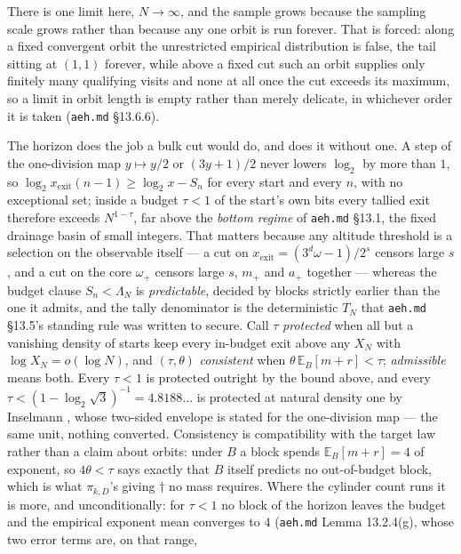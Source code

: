 \documentclass[11pt]{article}
\theoremstyle{remark}
\newcommand{\w}{\omega}
\newcommand{\wnext}{\w_{+}}
\begin{document}
There is one limit here, $N \to \infty$, and the sample grows because the sampling
scale grows rather than because any one orbit is run forever. That is forced: along
a fixed convergent orbit the unrestricted empirical distribution is false, the
tail sitting at $(1,1)$ forever, while above a fixed cut such an orbit
supplies only finitely many qualifying visits and none at all once the cut exceeds
its maximum, so a limit in orbit length is empty rather than merely delicate, in
whichever order it is taken (\texttt{aeh.md} \S13.6.6).

The horizon does the job a bulk cut would do, and does it without one. A step of
the one-division map $y \mapsto y/2$ or $(3y+1)/2$ never lowers $\log_2$ by more
than $1$, so $\log_2 x_{\mathrm{exit}}(n-1) \ge \log_2 x - S_n$ for every start and
every $n$, with no exceptional set; inside a budget $\tau < 1$ of the start's own
bits every tallied exit therefore exceeds $N^{1-\tau}$, far above the
\emph{bottom regime} of \texttt{aeh.md} \S13.1, the fixed drainage basin of small
integers. That matters because any altitude
threshold is a selection on the observable itself --- a cut on
$x_{\mathrm{exit}} = (3^{d}\w - 1)/2^{s}$ censors large $s$, and a cut on the core
$\wnext$ censors large $s$, $m_+$ and $a_+$ together --- whereas the budget clause
$S_n < \Lambda_N$ is \emph{predictable}, decided by blocks strictly earlier than
the one it admits, and the tally denominator is the deterministic $T_N$ that
\texttt{aeh.md} \S13.5's standing rule was written to secure. Call $\tau$
\emph{protected} when all but a
vanishing density of starts keep every in-budget exit above any $X_N$ with
$\log X_N = o(\log N)$, and $(\tau,\theta)$ \emph{consistent} when
$\theta\,\mathbb{E}_B[m+r] < \tau$; \emph{admissible} means both. Every
$\tau < 1$ is protected outright by the bound above, and every
$\tau < (1-\log_2\sqrt3)^{-1} = 4.8188\ldots$ is protected at natural density one
by Inselmann \cite[Thm.~1.1]{inselmann}, whose two-sided envelope is stated for
the one-division map --- the same unit, nothing converted.
Consistency is compatibility with the target law rather than a claim about
orbits: under $B$ a block spends $\mathbb{E}_B[m+r] = 4$ of exponent, so
$4\theta < \tau$ says exactly that $B$ itself predicts no out-of-budget block,
which is what $\pi_{k,D}$'s giving $\dagger$ no mass requires. Where the cylinder
count runs it is more, and unconditionally: for $\tau < 1$ no block of the horizon
leaves the budget and the empirical exponent mean converges to $4$
(\texttt{aeh.md} Lemma 13.2.4(g), whose two error terms are, on that range,
\end{document}
